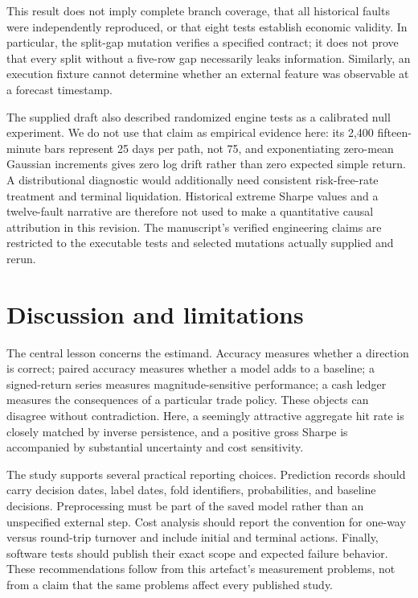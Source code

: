 \documentclass[preprint,12pt,authoryear]{elsarticle}
\begin{document}
This result does not imply complete branch coverage, that all historical faults were independently reproduced, or that eight tests establish economic validity. In particular, the split-gap mutation verifies a specified contract; it does not prove that every split without a five-row gap necessarily leaks information. Similarly, an execution fixture cannot determine whether an external feature was observable at a forecast timestamp.

The supplied draft also described randomized engine tests as a calibrated null experiment. We do not use that claim as empirical evidence here: its 2,400 fifteen-minute bars represent 25 days per path, not 75, and exponentiating zero-mean Gaussian increments gives zero log drift rather than zero expected simple return. A distributional diagnostic would additionally need consistent risk-free-rate treatment and terminal liquidation. Historical extreme Sharpe values and a twelve-fault narrative are therefore not used to make a quantitative causal attribution in this revision. The manuscript's verified engineering claims are restricted to the executable tests and selected mutations actually supplied and rerun.

\section{Discussion and limitations}
The central lesson concerns the estimand. Accuracy measures whether a direction is correct; paired accuracy measures whether a model adds to a baseline; a signed-return series measures magnitude-sensitive performance; a cash ledger measures the consequences of a particular trade policy. These objects can disagree without contradiction. Here, a seemingly attractive aggregate hit rate is closely matched by inverse persistence, and a positive gross Sharpe is accompanied by substantial uncertainty and cost sensitivity.

The study supports several practical reporting choices. Prediction records should carry decision dates, label dates, fold identifiers, probabilities, and baseline decisions. Preprocessing must be part of the saved model rather than an unspecified external step. Cost analysis should report the convention for one-way versus round-trip turnover and include initial and terminal actions. Finally, software tests should publish their exact scope and expected failure behavior. These recommendations follow from this artefact's measurement problems, not from a claim that the same problems affect every published study.
\end{document}
